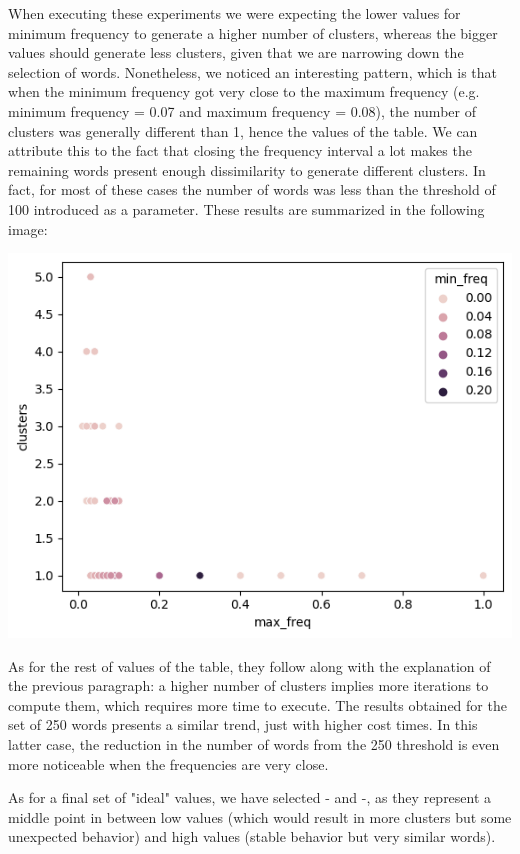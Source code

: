 When executing these experiments we were expecting the lower values for minimum frequency to generate a higher number of clusters, whereas the bigger values should generate less clusters, given that we are narrowing down the selection of words. Nonetheless, we noticed an interesting pattern, which is that when the minimum frequency got very close to the maximum frequency (e.g. minimum frequency = 0.07 and maximum frequency = 0.08), the number of clusters was generally different than 1, hence the values of the table. We can attribute this to the fact that closing the frequency interval a lot makes the remaining words present enough dissimilarity to generate different clusters. In fact, for most of these cases the number of words was less than the threshold of 100 introduced as a parameter. These results are summarized in the following image:

\includegraphics{figures/clusters_per_freq.png}

As for the rest of values of the table, they follow along with the explanation of the previous paragraph: a higher number of clusters implies more iterations to compute them, which requires more time to execute. The results obtained for the set of 250 words presents a similar trend, just with higher cost times. In this latter case, the reduction in the number of words from the 250 threshold is even more noticeable when the frequencies are very close.

As for a final set of "ideal" values, we have selected - and -, as they represent a middle point in between low values (which would result in more clusters but some unexpected behavior) and high values (stable behavior but very similar words).


